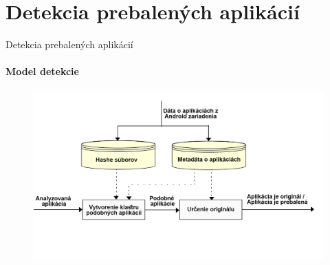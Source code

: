 \documentclass{beamer}
\begin{document}
  
    \section{Detekcia prebalených aplikácií}    
    \begin{frame}[label=lists]{Detekcia prebalených aplikácií}
 	 \framesubtitle{Model detekcie}
		\begin{figure}[htb]
	  	\begin{center}
    		\includegraphics[height=6.5cm]{images/detection-overview.png}
  		\end{center}
	\end{figure}
  \end{frame}   
  
\end{document}
